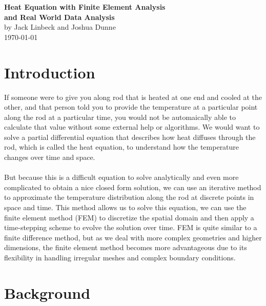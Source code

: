 \documentclass[11pt]{article}
\begin{document}
\begin{center}
    \LARGE \textbf{Heat Equation with Finite Element Analysis \\ and Real World Data Analysis} \\[0.5cm]
    \large by Jack Linbeck and Joshua Dunne \\[0.3cm]
    \today
\end{center}

\begin{onehalfspace}
\section*{Introduction}
    If someone were to give you along rod that is heated at one end and cooled at the other, and that person told you to provide the temperature at a particular point along the rod at a particular time, you would not be automaically able to calculate that value without some external help or algorithms.
    We would want to solve a partial differential equation that describes how heat diffuses through the rod, which is called the heat equation, to understand how the temperature changes over time and space.
    \\\\
    But because this is a difficult equation to solve analytically and even more complicated to obtain a nice closed form solution, we can use an iterative method to approximate the temperature distribution along the rod at discrete points in space and time.
    This method allows us to solve this equation, we can use the finite element method (FEM) to discretize the spatial domain and then apply a time-stepping scheme to evolve the solution over time.
    FEM is quite similar to a finite difference method, but as we deal with more complex geometries and higher dimensions, the finite element method becomes more advantageous due to its flexibility in handling irregular meshes and complex boundary conditions.

\section*{Background}


\end{onehalfspace}
\end{document}
